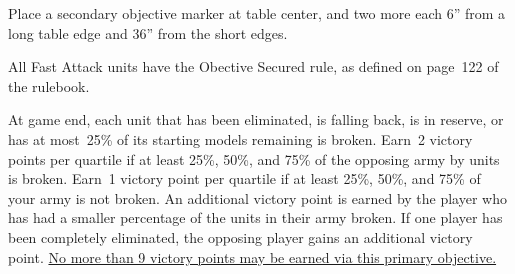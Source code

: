 

\begin{tablesetup}

  \vanguardstrike

  \bigskip%
  Place a secondary objective marker at table center, and two more
  each 6'' from a long table edge and 36'' from the short edges.
\end{tablesetup}

\begin{missionrules}

\nightfighting

  All Fast Attack units have the
Obective Secured rule, as defined on page~122 of the rulebook.

\end{missionrules}


\begin{scoring}
  
\begin{primaries}
  At game end, each unit that has been eliminated, is falling back, is
  in reserve, or has at most~25\% of its starting models remaining is
  broken.  Earn~2 victory points per quartile if at least 25\%, 50\%,
  and 75\% of the opposing army by units is broken.  Earn~1 victory
  point per quartile if at least 25\%, 50\%, and 75\% of your army is
  not broken.  An additional victory point is earned by the player who
  has had a smaller percentage of the units in their army broken.  If
  one player has been completely eliminated, the opposing player gains
  an additional victory point.  \underline{No more than 9 victory
    points may be earned via this primary objective.}
\end{primaries}

\begin{secondaries}
  \stalwart

  \controlthefield

  \reconnaissance

  \seekanddestroy
\end{secondaries}

\end{scoring}

